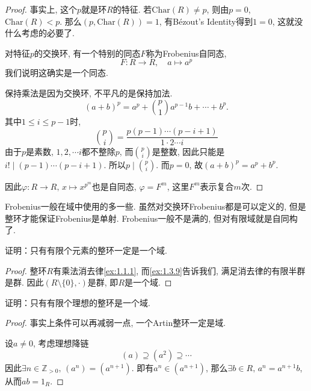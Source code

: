 \begin{proof}
    事实上, 这个$p$就是环$R$的特征. 若$\mathrm{Char}(R) \neq p$, 则由$p = 0$, $\mathrm{Char}(R) < p$.
    那么$(p, \mathrm{Char}(R)) = 1$, 有Bézout's Identity得到$1 = 0$, 这就没什么考虑的必要了.

    对特征$p$的交换环, 有一个特别的同态$F$称为Frobenius自同态,
    \[
        F: R \to R, \quad a \mapsto a^p
    \]
    我们说明这确实是一个同态.
    
    保持乘法是因为交换环, 不平凡的是保持加法.
    \[
        (a + b)^p = a^p + \binom{p}{1}a^{p - 1}b + \cdots + b^p.
    \]
    其中$1 \leqslant i \leqslant p - 1$时,
    \[
        \binom{p}{i} = \frac{p(p - 1) \cdots (p - i + 1)}{1 \cdot 2 \cdots i} 
    \]
    由于$p$是素数, $1, 2, \cdots i$都不整除$p$, 而$\binom{p}{i}$是整数, 因此只能是$i! \mid (p - 1) \cdots (p - i + 1)$. 所以$p \mid \binom{p}{i}$. 而$p = 0$, 故$(a + b)^p = a^p + b^p$.

    因此$\varphi: R \to R,\, x \mapsto x^{p^m}$也是自同态, $\varphi = F^m$, 这里$F^m$表示复合$m$次.
\end{proof}

\begin{remark}
    Frobenius一般在域中使用的多一些. 虽然对交换环Frobenius都是可以定义的, 但是整环才能保证Frobenius是单射. Frobenius一般不是满的, 但对有限域就是自同构了.
\end{remark}

\begin{problem}
    证明：只有有限个元素的整环一定是一个域.
\end{problem}

\begin{proof}
    整环$R$有乘法消去律\ref{ex:1.1.1}, 而\ref{ex:1.3.9}告诉我们, 满足消去律的有限半群是群. 因此$(R \setminus \{0\}, \cdot)$是群, 即$R$是一个域.
\end{proof}

\begin{problem}\label{ex:2.1.4}
    证明：只有有限个理想的整环是一个域.
\end{problem}

\begin{proof}
    事实上条件可以再减弱一点, 一个Artin整环一定是域.

    设$a \neq 0$, 考虑理想降链
    \[
        (a) \supseteq (a^2) \supseteq \cdots 
    \]
    因此$\exists n \in \mathbb{Z}_{>0},\, (a^n) = (a^{n + 1})$. 即有$a^n \in (a^{n + 1})$, 那么$\exists b \in R,\, a^n = a^{n + 1}b$, 从而$ab = 1_R$.
\end{proof}

